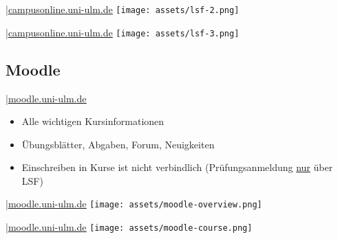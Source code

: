 \documentclass[
	aspectratio=169, 
	8pt 
]{beamer}
\newcommand*\annotatedFigureBoxCustom[8]{\draw[#5,thick,rounded corners] (#1) rectangle (#2);\node at (#4) [fill=#6,thick,shape=circle,draw=#7,inner sep=2pt,font=\sffamily,text=#8] {\textbf{#3}};}
\newcommand*\annotatedFigureBox[4]{\annotatedFigureBoxCustom{#1}{#2}{#3}{#4}{black}{white}{black}{black}}
\newenvironment {annotatedFigure}[1]{\centering\begin{tikzpicture}
    \node[anchor=south west,inner sep=0] (image) at (0,0) { #1};\begin{scope}[x={(image.south east)},y={(image.north west)}]}{\end{scope}\end{tikzpicture}}
\begin{document}
\begin{frame}{\insertsubsection \space|\space\underline{\href{https://campusonline.uni-ulm.de}{campusonline.uni-ulm.de}}}
    \texttt{[image: assets/lsf-2.png]}
\end{frame}

\begin{frame}{\insertsubsection \space|\space\underline{\href{https://campusonline.uni-ulm.de}{campusonline.uni-ulm.de}}}
    \texttt{[image: assets/lsf-3.png]}
\end{frame}


\subsection{Moodle}
\begin{frame}{\insertsubsection \space|\space\underline{\href{https://moodle.uni-ulm.de}{moodle.uni-ulm.de}}}
    \begin{itemize}
        \item Alle wichtigen Kursinformationen 
        \item Übungsblätter, Abgaben, Forum, Neuigkeiten
        \item Einschreiben in Kurse ist nicht verbindlich (Prüfungsanmeldung \underline{nur} über LSF)
    \end{itemize}
\end{frame}

\begin{frame}{\insertsubsection \space|\space\underline{\href{https://moodle.uni-ulm.de}{moodle.uni-ulm.de}}}
    \texttt{[image: assets/moodle-overview.png]}
\end{frame}

\begin{frame}{\insertsubsection \space|\space\underline{\href{https://moodle.uni-ulm.de}{moodle.uni-ulm.de}}}
    \texttt{[image: assets/moodle-course.png]}
\end{frame}
\end{document}
